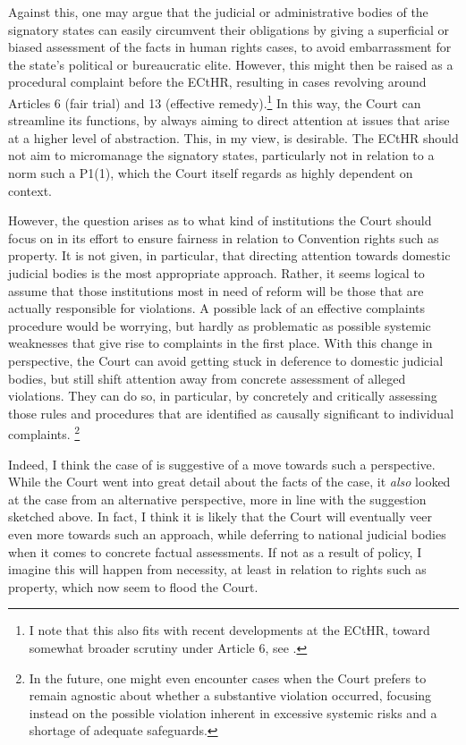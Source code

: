\documentclass[12pt,a4paper]{book} %
\begin{document}
Against this, one may argue that the judicial or administrative bodies of the signatory states can easily circumvent their obligations by giving a superficial or biased assessment of the facts in human rights cases, to avoid embarrassment for the state's political or bureaucratic elite. However, this might then be raised as a procedural complaint before the ECtHR, resulting in cases revolving around Articles 6 (fair trial) and 13 (effective remedy).\footnote{I note that this also fits with recent developments at the ECtHR, toward somewhat broader scrutiny under Article 6, see \cite{khamidov07}.}  In this way, the Court can streamline its functions, by always aiming to direct attention at issues that arise at a higher level of abstraction. This, in my view, is desirable. The ECtHR should not aim to micromanage the signatory states, particularly not in relation to a norm such a P1(1), which the Court itself regards as highly dependent on context.

However, the question arises as to what kind of institutions the Court should focus on in its effort to ensure fairness in relation to Convention rights such as property. It is not given, in particular, that directing attention towards domestic judicial bodies is the most appropriate approach. Rather, it seems logical to assume that those institutions most in need of reform will be those that are actually responsible for violations. A possible lack of an effective complaints procedure would be worrying, but hardly as problematic as possible systemic weaknesses that give rise to complaints in the first place. With this change in perspective, the Court can avoid getting stuck in deference to domestic judicial bodies, but still shift attention away from concrete assessment of alleged violations. They can do so, in particular, by concretely and critically assessing those rules and procedures that are identified as causally significant to individual complaints. \footnote{In the future, one might even encounter cases when the Court prefers to remain agnostic about whether a substantive violation occurred, focusing instead on the possible violation inherent in excessive systemic risks and a shortage of adequate safeguards.}

Indeed, I think the case of \textcite{hutten06} is suggestive of a move towards such a perspective. While the Court went into great detail about the facts of the case, it {\it also} looked at the case from an alternative perspective, more in line with the suggestion sketched above. In fact, I think it is likely that the Court will eventually veer even more towards such an approach, while deferring to national judicial bodies when it comes to concrete factual assessments. If not as a result of policy, I imagine this will happen from necessity, at least in relation to rights such as property, which now seem to flood the Court.
\end{document}
